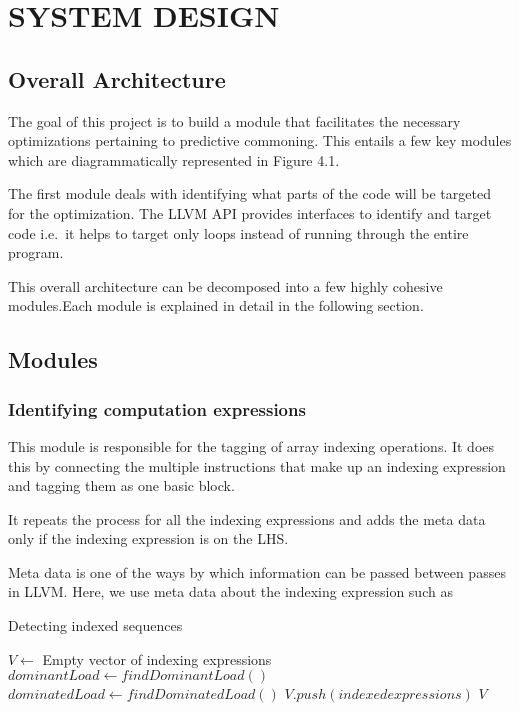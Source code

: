 \chapter{SYSTEM DESIGN} %

\section{Overall Architecture}
The goal of this project is to build a module that facilitates the necessary optimizations pertaining to predictive commoning. This entails a few key modules which are diagrammatically represented in Figure 4.1.
\newline

The first module deals with identifying what parts of the code will be targeted for the optimization. The LLVM API provides interfaces to identify and target code i.e.\ it helps to target only loops instead of running through the entire program. 

This overall architecture can be decomposed into a few highly cohesive modules.Each module is explained in detail in the following section.

\section{Modules}
\subsection{Identifying computation expressions}

This module is responsible for the tagging of array indexing operations. It does this by connecting the multiple instructions that make up an indexing expression and tagging them as one basic block.

It repeats the process for all the indexing expressions and adds the meta data only if the indexing expression is on the LHS.

Meta data is one of the ways by which information can be passed between passes in LLVM. Here, we use meta data about the indexing expression such as 

\begin{algorithm}
	\caption{Detecting indexed sequences}
	\begin{algorithmic}
		
		\STATE $V \leftarrow$ Empty vector of indexing expressions
		\STATE $dominantLoad \leftarrow findDominantLoad()$
		\STATE $dominatedLoad \leftarrow findDominatedLoad()$
		\STATE $V.push(indexed expressions)$
		\ENDIF
		\ENDFOR
		\RETURN $V$
		
	\end{algorithmic}
\end{algorithm}





